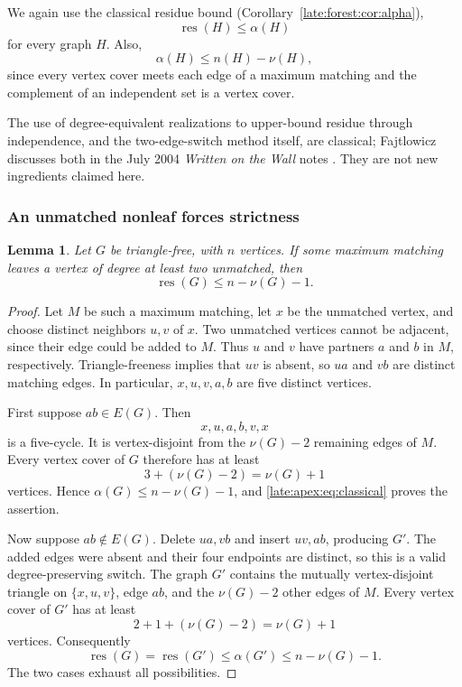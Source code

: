 \documentclass[11pt,a4paper]{article}
\newtheorem{lemma}[theorem]{Lemma}
\theoremstyle{definition}\newtheorem{definition}[theorem]{Definition}
\theoremstyle{remark}\newtheorem{remark}[theorem]{Remark}
\newcommand{\res}{\operatorname{res}}
\begin{document}
We again use the classical residue bound
(Corollary~\ref{late:forest:cor:alpha}),
\begin{equation}\label{late:apex:eq:classical}
 \res(H)\le\alpha(H)
\end{equation}
for every graph $H$. Also,
\begin{equation}\label{late:apex:eq:matching}
 \alpha(H)\le n(H)-\nu(H),
\end{equation}
since every vertex cover meets each edge of a maximum matching and the
complement of an independent set is a vertex cover.

The use of degree-equivalent realizations to upper-bound residue through
independence, and the two-edge-switch method itself, are classical;
Fajtlowicz discusses both in the July 2004 \emph{Written on the Wall}
notes \cite[p.~37]{late:apex:Fajtlowicz}. They are not new ingredients claimed here.

\subsubsection{An unmatched nonleaf forces strictness}
\begin{lemma}\label{late:apex:lem:unmatched}
Let $G$ be triangle-free, with $n$ vertices. If some maximum matching
leaves a vertex of degree at least two unmatched, then
\[
 \res(G)\le n-\nu(G)-1.
\]
\end{lemma}
\begin{proof}
Let $M$ be such a maximum matching, let $x$ be the unmatched vertex, and
choose distinct neighbors $u,v$ of $x$. Two unmatched vertices cannot be
adjacent, since their edge could be added to $M$. Thus $u$ and $v$ have
partners $a$ and $b$ in $M$, respectively. Triangle-freeness implies that
$uv$ is absent, so $ua$ and $vb$ are distinct matching edges. In particular,
$x,u,v,a,b$ are five distinct vertices.

First suppose $ab\in E(G)$. Then
\[
 x,u,a,b,v,x
\]
is a five-cycle. It is vertex-disjoint from the $\nu(G)-2$ remaining
edges of $M$. Every vertex cover of $G$ therefore has at least
\[
 3+(\nu(G)-2)=\nu(G)+1
\]
vertices. Hence $\alpha(G)\le n-\nu(G)-1$, and
\eqref{late:apex:eq:classical} proves the assertion.

Now suppose $ab\notin E(G)$. Delete $ua,vb$ and insert $uv,ab$, producing
$G'$. The added edges were absent and their four endpoints are distinct,
so this is a valid degree-preserving switch. The graph $G'$ contains the
mutually vertex-disjoint triangle on $\{x,u,v\}$, edge $ab$, and the
$\nu(G)-2$ other edges of $M$. Every vertex cover of $G'$ has at least
\[
 2+1+(\nu(G)-2)=\nu(G)+1
\]
vertices. Consequently
\[
 \res(G)=\res(G')\le\alpha(G')\le n-\nu(G)-1.
\]
The two cases exhaust all possibilities.
\end{proof}
\end{document}
